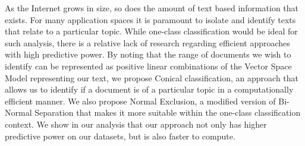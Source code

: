 As the Internet grows in size, so does the amount of text based information that exists. For many application spaces it is paramount to isolate and identify texts that relate to a particular topic. While one-class classification would be ideal for such analysis, there is a relative lack of research regarding efficient approaches with high predictive power. By noting that the range of documents we wish to identify can be represented as positive linear combinations of the Vector Space Model representing our text, we propose Conical classification, an approach that allows us to identify if a document is of a particular topic in a computationally efficient manner. We also propose Normal Exclusion, a modified version of Bi-Normal Separation that makes it more suitable within the one-class classification context. We show in our analysis that our approach not only has higher predictive power on our datasets, but is also faster to compute.
